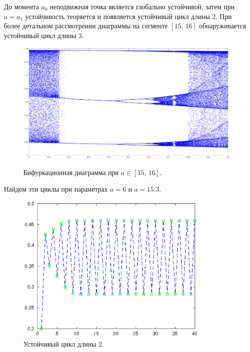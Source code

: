 \documentclass[16pt]{article}
\begin{document}
До момента $a_0$ неподвижная точка является глобально устойчивой, затем при $a = a_1$ устойчивость теоряется 
и появляется
устойчивый цикл длины 2. При более детальном рассмотрении диаграммы на сегменте $[15,\,16]$ обнаруживается
устойчивый цикл длины 3. 

\begin{figure}[h]
\begin{center}
\includegraphics[width=140mm]{bif2.eps} \label{bif2}
\caption{Бифуркационная диаграмма при $a \in [15,\, 16]$.}
\end{center}
\end{figure}

\newpage
Найдем эти циклы при параметрах $a = 6$ и $a = 15.3$.

\begin{figure}[h]
\begin{center}
\includegraphics[width=95mm]{cycle2.eps}
\caption{Устойчивый цикл длины 2.}
\end{center}
\end{figure}
\end{document}
